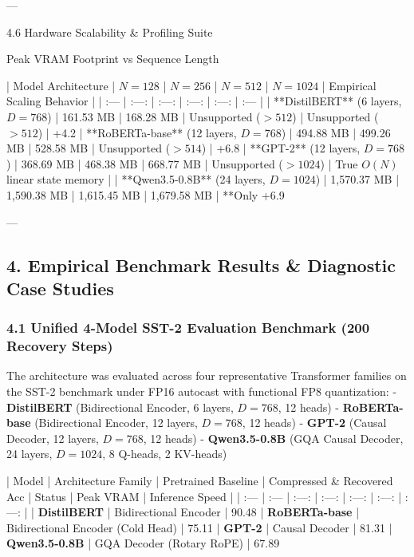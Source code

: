 ---

 4.6 Hardware Scalability \& Profiling Suite

 Peak VRAM Footprint vs Sequence Length

| Model Architecture | $N = 128$ | $N = 256$ | $N = 512$ | $N = 1024$ | Empirical Scaling Behavior |
| :--- | :---: | :---: | :---: | :---: | :--- |
| **DistilBERT** (6 layers, $D=768$) | 161.53 MB | 168.28 MB | Unsupported ($>512$) | Unsupported ($>512$) | +4.2%
| **RoBERTa-base** (12 layers, $D=768$) | 494.88 MB | 499.26 MB | 528.58 MB | Unsupported ($>514$) | +6.8%
| **GPT-2** (12 layers, $D=768$) | 368.69 MB | 468.38 MB | 668.77 MB | Unsupported ($>1024$) | True $O(N)$ linear state memory |
| **Qwen3.5-0.8B** (24 layers, $D=1024$) | 1,570.37 MB | 1,590.38 MB | 1,615.45 MB | 1,679.58 MB | **Only +6.9%

---



\subsection{4. Empirical Benchmark Results \& Diagnostic Case Studies}
\subsubsection{4.1 Unified 4-Model SST-2 Evaluation Benchmark (200 Recovery Steps)}

The architecture was evaluated across four representative Transformer families on the SST-2 benchmark under FP16 autocast with functional FP8 quantization:
- \textbf{DistilBERT} (Bidirectional Encoder, 6 layers, $D=768$, 12 heads)
- \textbf{RoBERTa-base} (Bidirectional Encoder, 12 layers, $D=768$, 12 heads)
- \textbf{GPT-2} (Causal Decoder, 12 layers, $D=768$, 12 heads)
- \textbf{Qwen3.5-0.8B} (GQA Causal Decoder, 24 layers, $D=1024$, 8 Q-heads, 2 KV-heads)

| Model | Architecture Family | Pretrained Baseline | Compressed \& Recovered Acc | Status | Peak VRAM | Inference Speed |
| :--- | :--- | :---: | :---: | :---: | :---: | :---: |
| \textbf{DistilBERT} | Bidirectional Encoder | 90.48%
| \textbf{RoBERTa-base} | Bidirectional Encoder (Cold Head) | 75.11%
| \textbf{GPT-2} | Causal Decoder | 81.31%
| \textbf{Qwen3.5-0.8B} | GQA Decoder (Rotary RoPE) | 67.89%

